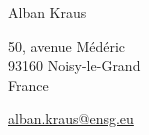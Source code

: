 Alban Kraus

50, avenue Médéric\\
93\/160 Noisy-le-Grand\\
France

\href{mailto:alban.kraus@ensg.eu}{alban.kraus@ensg.eu}
